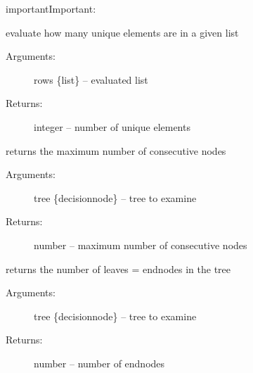 \documentclass[letterpaper,10pt,english]{sphinxmanual}
\begin{document}
\begin{sphinxadmonition}{important}{Important:}
\begin{fulllineitems}
\label{\detokenize{DT:ForestFire.Main.uniquecounts}}
evaluate how many unique elements are in a given list
\begin{description}
\item[{Arguments:}] \leavevmode
rows \{list\} -- evaluated list

\item[{Returns:}] \leavevmode
integer -- number of unique elements

\end{description}

\end{fulllineitems}

\label{\detokenize{DT:getdepth}}

\begin{fulllineitems}
\label{\detokenize{DT:ForestFire.Main.getdepth}}
returns the maximum number of consecutive nodes
\begin{description}
\item[{Arguments:}] \leavevmode
tree \{decisionnode\} -- tree to examine

\item[{Returns:}] \leavevmode
number -- maximum number of consecutive nodes

\end{description}

\end{fulllineitems}

\label{\detokenize{DT:getwidth}}

\begin{fulllineitems}
\label{\detokenize{DT:ForestFire.Main.getwidth}}
returns the number of leaves = endnodes in the tree
\begin{description}
\item[{Arguments:}] \leavevmode
tree \{decisionnode\} -- tree to examine

\item[{Returns:}] \leavevmode
number -- number of endnodes

\end{description}


\end{fulllineitems}
\end{sphinxadmonition}
\end{document}
